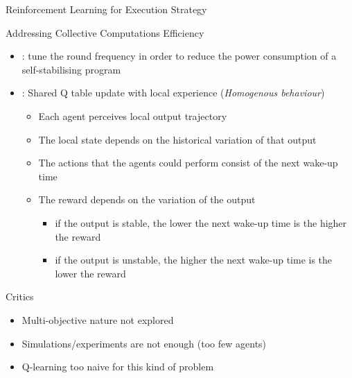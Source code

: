 \documentclass[presentation, 9pt]{beamer}\mode<presentation>{\usetheme{AMSBolognaFC}}
\begin{document}
\begin{frame}{Reinforcement Learning for Execution Strategy}
	\begin{alertblock}{Addressing Collective Computations Efficiency}
		\begin{itemize}
			\item {}: tune the round frequency in order to reduce the power consumption of a self-stabilising program
			\item {}: Shared Q table update with local experience (\emph{Homogenous behaviour})
			\begin{itemize}
				\item Each agent perceives local output trajectory
				\item The local state depends on the historical variation of that output
				\item The actions that the agents could perform consist of the next wake-up time
				\item The reward depends on the variation of the output
				\begin{itemize}
					\item if the output is stable, the lower the next wake-up time is the higher the reward
					\item if the output is unstable, the higher the next wake-up time is the lower the reward
				\end{itemize}
			\end{itemize}
		\end{itemize}
	\end{alertblock}
	\begin{block}{Critics}
		\begin{itemize}
			\item Multi-objective nature not explored
			\item Simulations/experiments are not enough (too few agents)
			\item Q-learning too naive for this kind of problem
		\end{itemize}
	\end{block}
\end{frame}
\end{document}

